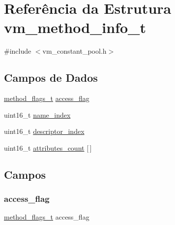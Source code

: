 \hypertarget{structvm__method__info__t}{}\section{Referência da Estrutura vm\+\_\+method\+\_\+info\+\_\+t}
\label{structvm__method__info__t}


{\ttfamily \#include $<$vm\+\_\+constant\+\_\+pool.\+h$>$}

\subsection*{Campos de Dados}
\begin{DoxyCompactItemize}
\item 
\hyperlink{vm__constant__pool_8h_a35028690ed5f5a4d636d9b211b0f0f75}{method\+\_\+flags\+\_\+t} \hyperlink{structvm__method__info__t_a86180f4e7491bbca03852675c711ee9e}{access\+\_\+flag}
\item 
uint16\+\_\+t \hyperlink{structvm__method__info__t_a898a74ada625e0b227dadb02901404e6}{name\+\_\+index}
\item 
uint16\+\_\+t \hyperlink{structvm__method__info__t_a042bbc76d835b82d27c1932431ee38d4}{descriptor\+\_\+index}
\item 
uint16\+\_\+t \hyperlink{structvm__method__info__t_ad1f36c37f10e055bb62a170c7a507a4c}{attributes\+\_\+count} \mbox{[}$\,$\mbox{]}
\end{DoxyCompactItemize}


\subsection{Campos}
\mbox{\label{structvm__method__info__t_a86180f4e7491bbca03852675c711ee9e}} 
\subsubsection{\texorpdfstring{access\+\_\+flag}{access\_flag}}
{\footnotesize\ttfamily \hyperlink{vm__constant__pool_8h_a35028690ed5f5a4d636d9b211b0f0f75}{method\+\_\+flags\+\_\+t} access\+\_\+flag}

\mbox{\label{structvm__method__info__t_ad1f36c37f10e055bb62a170c7a507a4c}} 

